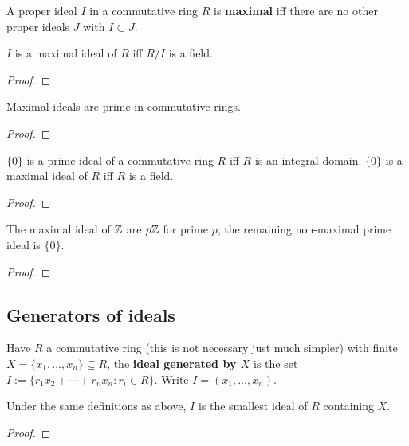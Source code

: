 \documentclass{report}
\begin{document}
\begin{definition}
    A proper ideal $I$ in a commutative ring $R$ is \textbf{maximal} iff there are no other proper ideals $J$ with $I\subset J$.
\end{definition}

\begin{proposition}
    $I$ is a maximal ideal of $R$ iff $R/I$ is a field.
    \begin{proof}
        
    \end{proof}
\end{proposition}

\begin{corollary}
    Maximal ideals are prime in commutative rings. \begin{proof}
        
    \end{proof}
\end{corollary}

\begin{corollary}
    $\{0\}$ is a prime ideal of a commutative ring $R$ iff $R$ is an integral domain. $\{0\}$ is a maximal ideal of $R$ iff $R$ is a field. \begin{proof}
        
    \end{proof}
\end{corollary}

\begin{corollary}
    The maximal ideal of $\mathbb{Z}$ are $p\mathbb{Z}$ for prime $p$, the remaining non-maximal prime ideal is $\{0\}$. \begin{proof}
        
    \end{proof}
\end{corollary}

\subsection{Generators of ideals}

\begin{definition}
    Have $R$ a commutative ring (this is not necessary just much simpler) with finite $X=\{x_1,\ldots,x_n\}\subseteq R$, the \textbf{ideal generated by $X$} is the set $I:=\{r_1x_2+\cdots+r_nx_n:r_i\in R\}$. Write $I=(x_1,\ldots,x_n)$.
\end{definition}

\begin{lemma}
    Under the same definitions as above, $I$ is the smallest ideal of $R$ containing $X$.\begin{proof}
        
    \end{proof}
\end{lemma}
\end{document}
